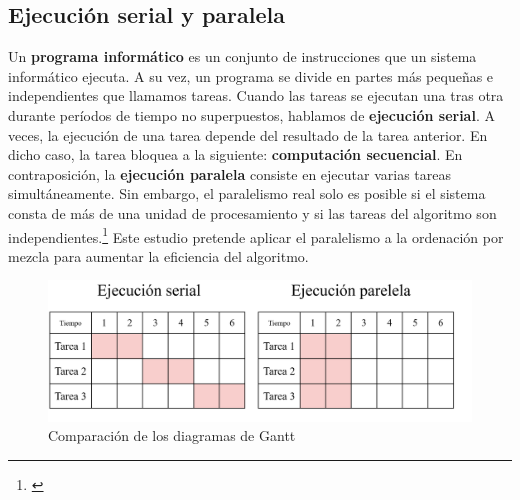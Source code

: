 \documentclass[titlepage]{article}
\begin{document}
\subsection{Ejecución serial y paralela} %
Un \textbf{programa informático} es un conjunto de instrucciones que un sistema informático ejecuta. A su vez, un programa se divide en partes más pequeñas e independientes que llamamos tareas. Cuando las tareas se ejecutan una tras otra durante períodos de tiempo no superpuestos, hablamos de \textbf{ejecución serial}. A veces, la ejecución de una tarea depende del resultado de la tarea anterior. En dicho caso, la tarea bloquea a la siguiente: \textbf{computación secuencial}. En contraposición, la \textbf{ejecución paralela} consiste en ejecutar varias tareas simultáneamente. Sin embargo, el paralelismo real solo es posible si el sistema consta de más de una unidad de procesamiento y si las tareas del algoritmo son independientes.\footnote{\cite{bobrov-2023}} Este estudio pretende aplicar el paralelismo a la ordenación por mezcla para aumentar la eficiencia del algoritmo.



\begin{figure}[h]
    \centering
    \captionsetup{justification=centering}
    \includegraphics[width=0.65\linewidth]{Diagrames/serialVsParallel.png}
    \caption{Comparación de los diagramas de Gantt}
    \label{fig:serialVsParallel}
\end{figure}
\end{document}
